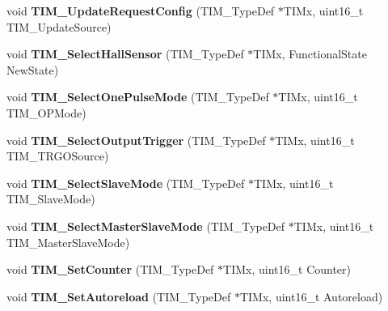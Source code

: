 \begin{DoxyCompactItemize}
\item 
\hypertarget{group__TIM__Exported__Functions_ga1d7a8f952e209de142499e67a653fc1f}{
void {\bfseries TIM\_\-UpdateRequestConfig} (TIM\_\-TypeDef $\ast$TIMx, uint16\_\-t TIM\_\-UpdateSource)}
\label{group__TIM__Exported__Functions_ga1d7a8f952e209de142499e67a653fc1f}

\item 
\hypertarget{group__TIM__Exported__Functions_ga42c2d1025a3937c9d9f38631af86ffa4}{
void {\bfseries TIM\_\-SelectHallSensor} (TIM\_\-TypeDef $\ast$TIMx, FunctionalState NewState)}
\label{group__TIM__Exported__Functions_ga42c2d1025a3937c9d9f38631af86ffa4}

\item 
\hypertarget{group__TIM__Exported__Functions_gadd2cca5fac6c1291dc4339098d5c9562}{
void {\bfseries TIM\_\-SelectOnePulseMode} (TIM\_\-TypeDef $\ast$TIMx, uint16\_\-t TIM\_\-OPMode)}
\label{group__TIM__Exported__Functions_gadd2cca5fac6c1291dc4339098d5c9562}

\item 
\hypertarget{group__TIM__Exported__Functions_ga28745aaa549e2067e42c19569209e6c6}{
void {\bfseries TIM\_\-SelectOutputTrigger} (TIM\_\-TypeDef $\ast$TIMx, uint16\_\-t TIM\_\-TRGOSource)}
\label{group__TIM__Exported__Functions_ga28745aaa549e2067e42c19569209e6c6}

\item 
\hypertarget{group__TIM__Exported__Functions_ga2f19ce1d90990691cf037e419ba08003}{
void {\bfseries TIM\_\-SelectSlaveMode} (TIM\_\-TypeDef $\ast$TIMx, uint16\_\-t TIM\_\-SlaveMode)}
\label{group__TIM__Exported__Functions_ga2f19ce1d90990691cf037e419ba08003}

\item 
\hypertarget{group__TIM__Exported__Functions_ga4dcc3d11b670c381d0ff9cb7e9fd01e2}{
void {\bfseries TIM\_\-SelectMasterSlaveMode} (TIM\_\-TypeDef $\ast$TIMx, uint16\_\-t TIM\_\-MasterSlaveMode)}
\label{group__TIM__Exported__Functions_ga4dcc3d11b670c381d0ff9cb7e9fd01e2}

\item 
\hypertarget{group__TIM__Exported__Functions_gaad2c31dc9c551b48f08b96ba49c4aa44}{
void {\bfseries TIM\_\-SetCounter} (TIM\_\-TypeDef $\ast$TIMx, uint16\_\-t Counter)}
\label{group__TIM__Exported__Functions_gaad2c31dc9c551b48f08b96ba49c4aa44}

\item 
\hypertarget{group__TIM__Exported__Functions_ga7880e4c00002d6421f9059a2ed841d5c}{
void {\bfseries TIM\_\-SetAutoreload} (TIM\_\-TypeDef $\ast$TIMx, uint16\_\-t Autoreload)}
\label{group__TIM__Exported__Functions_ga7880e4c00002d6421f9059a2ed841d5c}


\end{DoxyCompactItemize}
